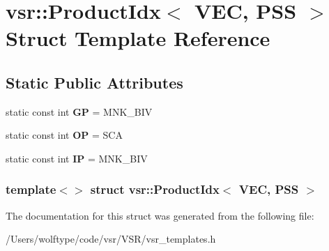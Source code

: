 \hypertarget{structvsr_1_1_product_idx_3_01_v_e_c_00_01_p_s_s_01_4}{\section{vsr\-:\-:Product\-Idx$<$ V\-E\-C, P\-S\-S $>$ Struct Template Reference}
\label{structvsr_1_1_product_idx_3_01_v_e_c_00_01_p_s_s_01_4}
}
\subsection*{Static Public Attributes}
\begin{DoxyCompactItemize}
\item 
\hypertarget{structvsr_1_1_product_idx_3_01_v_e_c_00_01_p_s_s_01_4_ac72042897f7633d51f6adbadbdff27eb}{static const int {\bfseries G\-P} = M\-N\-K\-\_\-\-B\-I\-V}\label{structvsr_1_1_product_idx_3_01_v_e_c_00_01_p_s_s_01_4_ac72042897f7633d51f6adbadbdff27eb}

\item 
\hypertarget{structvsr_1_1_product_idx_3_01_v_e_c_00_01_p_s_s_01_4_a3d1c28f6060e33720d7d97323fefa527}{static const int {\bfseries O\-P} = S\-C\-A}\label{structvsr_1_1_product_idx_3_01_v_e_c_00_01_p_s_s_01_4_a3d1c28f6060e33720d7d97323fefa527}

\item 
\hypertarget{structvsr_1_1_product_idx_3_01_v_e_c_00_01_p_s_s_01_4_ac836820b9d1cd5b2bc1f9dc5c5189d55}{static const int {\bfseries I\-P} = M\-N\-K\-\_\-\-B\-I\-V}\label{structvsr_1_1_product_idx_3_01_v_e_c_00_01_p_s_s_01_4_ac836820b9d1cd5b2bc1f9dc5c5189d55}

\end{DoxyCompactItemize}
\subsubsection*{template$<$$>$ struct vsr\-::\-Product\-Idx$<$ V\-E\-C, P\-S\-S $>$}



The documentation for this struct was generated from the following file\-:\begin{DoxyCompactItemize}
\item 
/\-Users/wolftype/code/vsr/\-V\-S\-R/vsr\-\_\-templates.\-h\end{DoxyCompactItemize}
